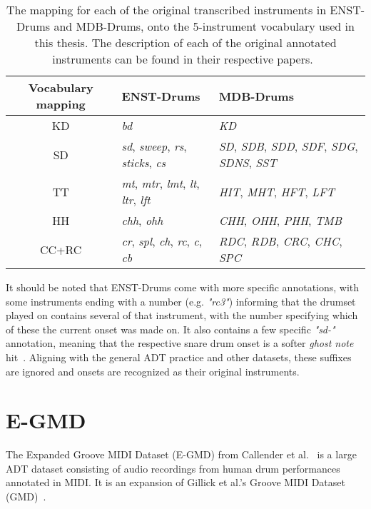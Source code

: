 \begin{table}[H]
    \centering
    \hspace*{-0.6cm}
    \begin{tabular}{c|ll}
        Vocabulary mapping & ENST-Drums & MDB-Drums \\
        \hline
        \acrfull{KD} & \textit{bd} & \textit{KD} \\
        \acrfull{SD} & \textit{sd}, \textit{sweep}, \textit{rs}, \textit{sticks}, \textit{cs} & \textit{SD}, \textit{SDB}, \textit{SDD}, \textit{SDF}, \textit{SDG}, \textit{SDNS}, \textit{SST} \\
        \acrfull{TT} & \textit{mt}, \textit{mtr}, \textit{lmt}, \textit{lt}, \textit{ltr}, \textit{lft} & \textit{HIT}, \textit{MHT}, \textit{HFT}, \textit{LFT} \\
        \acrfull{HH} & \textit{chh}, \textit{ohh} & \textit{CHH}, \textit{OHH}, \textit{PHH}, \textit{TMB} \\
        \acrfull{CC+RC} & \textit{cr}, \textit{spl}, \textit{ch}, \textit{rc}, \textit{c}, \textit{cb} & \textit{RDC}, \textit{RDB}, \textit{CRC}, \textit{CHC}, \textit{SPC} \\
    \end{tabular}
    \caption{The mapping for each of the original transcribed instruments in ENST-Drums and MDB-Drums, onto the 5-instrument vocabulary used in this thesis. The description of each of the original annotated instruments can be found in their respective papers.~\cite{gillet2006enst, southall2017mdb}}
    \label{ENSTMDBMapping}
\end{table}

It should be noted that ENST-Drums come with more specific annotations, with some instruments ending with a number (e.g. \textit{"rc3"}) informing that the drumset played on contains several of that instrument, with the number specifying which of these the current onset was made on. It also contains a few specific \textit{"sd-"} annotation, meaning that the respective snare drum onset is a softer \textit{ghost note} hit~\cite{gillet2006enst}. Aligning with the general \gls{ADT} practice and other datasets, these suffixes are ignored and onsets are recognized as their original instruments.

\section{E-GMD}

The Expanded Groove MIDI Dataset (E-GMD) from Callender et al.~\cite{callender2020improvingperceptualqualitydrum} is a large \gls{ADT} dataset consisting of audio recordings from human drum performances annotated in MIDI. It is an expansion of Gillick et al.'s Groove MIDI Dataset (GMD)~\cite{pmlr-v97-gillick19a}.

